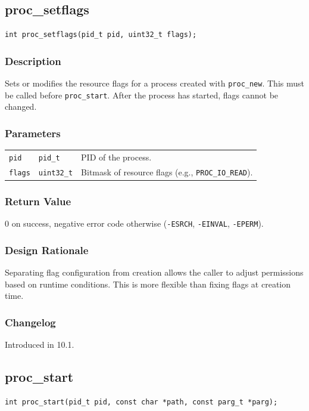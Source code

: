 \documentclass[12pt,a4paper]{article}
\begin{document}
\subsection{proc\_setflags}
\begin{lstlisting}
int proc_setflags(pid_t pid, uint32_t flags);
\end{lstlisting}

\subsubsection{Description}
Sets or modifies the resource flags for a process created with \texttt{proc\_new}. This must be called before \texttt{proc\_start}. After the process has started, flags cannot be changed.

\subsubsection{Parameters}
\begin{tabularx}{\textwidth}{|l|l|X|}
\hline
\verb|pid| & \verb|pid_t| & PID of the process. \\
\verb|flags| & \verb|uint32_t| & Bitmask of resource flags (e.g., \texttt{PROC\_IO\_READ}). \\
\hline
\end{tabularx}

\subsubsection{Return Value}
0 on success, negative error code otherwise (\texttt{-ESRCH}, \texttt{-EINVAL}, \texttt{-EPERM}).

\subsubsection{Design Rationale}
Separating flag configuration from creation allows the caller to adjust permissions based on runtime conditions. This is more flexible than fixing flags at creation time.

\subsubsection{Changelog}
Introduced in 10.1.

\subsection{proc\_start}
\begin{lstlisting}
int proc_start(pid_t pid, const char *path, const parg_t *parg);
\end{lstlisting}
\end{document}
